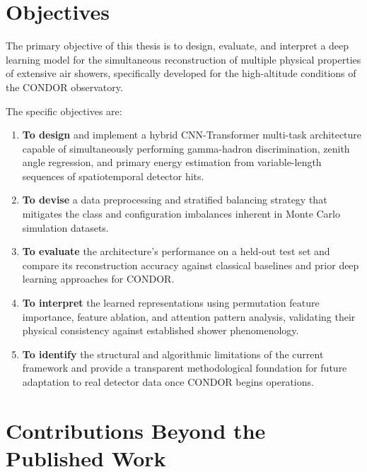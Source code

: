 \section{Objectives}

The primary objective of this thesis is to design, evaluate, and interpret a deep learning model for the simultaneous reconstruction of multiple physical properties of extensive air showers, specifically developed for the high-altitude conditions of the CONDOR observatory.

The specific objectives are:
\begin{enumerate}
    \item \textbf{To design} and implement a hybrid CNN-Transformer multi-task architecture capable of simultaneously performing gamma-hadron discrimination, zenith angle regression, and primary energy estimation from variable-length sequences of spatiotemporal detector hits.
    
    \item \textbf{To devise} a data preprocessing and stratified balancing strategy that mitigates the class and configuration imbalances inherent in Monte Carlo simulation datasets.
    
    \item \textbf{To evaluate} the architecture's performance on a held-out test set and compare its reconstruction accuracy against classical baselines and prior deep learning approaches for CONDOR.
    
    \item \textbf{To interpret} the learned representations using permutation feature importance, feature ablation, and attention pattern analysis, validating their physical consistency against established shower phenomenology.
    
    \item \textbf{To identify} the structural and algorithmic limitations of the current framework and provide a transparent methodological foundation for future adaptation to real detector data once CONDOR begins operations.
\end{enumerate}

\section{Contributions Beyond the Published Work}
\label{sec:contributions_intro}

